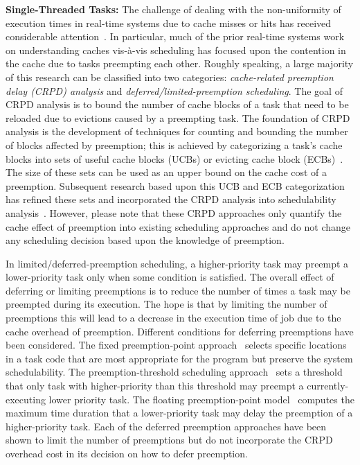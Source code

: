 \documentclass[a4paper,UKenglish,cleveref,autoref,english]{lipics-v2019}
\begin{document}
\noindent
{\bf Single-Threaded Tasks:}  The challenge of dealing with the
non-uniformity of execution times in real-time systems due to cache
misses or hits has received considerable attention~\cite{Wilhelm:2008,Theiling:2000}. In
particular, much of the 
prior real-time systems work on understanding caches vis-\`{a}-vis scheduling has focused upon the contention in the
cache due to tasks preempting each other.  Roughly speaking, a large
majority of this research can be classified into two categories:
\emph{cache-related preemption delay (CRPD) analysis} and
\emph{deferred/limited-preemption scheduling}. 
The goal of CRPD analysis is to bound the number of cache blocks of a
task that need to be reloaded due to evictions caused by a preempting
task.  The foundation of CRPD analysis is the development of
techniques for counting and bounding the number of blocks affected by
preemption; this is achieved by categorizing a task's cache blocks
into sets of useful cache blocks (UCBs) or evicting cache block
(ECBs)~\cite{Lee:1998,Tomiyama:2000}.  The size of these sets can be
used as an upper bound on the cache cost of a preemption.  Subsequent
research based upon this UCB and ECB categorization has refined these
sets and incorporated the CRPD analysis into schedulability
analysis~\cite{Altmeyer:2012,Altmeyer:2011,Altmeyer:2011b,Negi:2003,
  Staschulat:2005, Tan:2004}. 
However, please note that these CRPD approaches only quantify the
cache effect of preemption into existing scheduling approaches and do not
change any scheduling decision based upon the knowledge of
preemption. 

In limited/deferred-preemption scheduling, a higher-priority task may
preempt a lower-priority task only when some condition is satisfied.
The overall effect of deferring or limiting preemptions is to reduce
the number of times a task may be preempted during its execution.  The
hope is that by limiting the number of preemptions this will lead to a
decrease in the execution time of job due to the cache overhead of
preemption.  Different conditions for deferring preemptions have been
considered.  The fixed preemption-point approach~\cite{Burns:1995}
selects specific locations in a task code that are most appropriate
for the program but preserve the system schedulability.  The
preemption-threshold scheduling approach~\cite{Wang:1999} sets a
threshold that only task with higher-priority than this threshold may
preempt a currently-executing lower priority task.  The floating
preemption-point model~\cite{Baruah:2005,Marinho:2012} computes the
maximum time duration that a lower-priority task may delay the
preemption of a higher-priority task.  Each of the deferred preemption
approaches have been shown to limit the number of preemptions but do
not incorporate the CRPD overhead cost in its decision on how to defer
preemption. 
\end{document}
